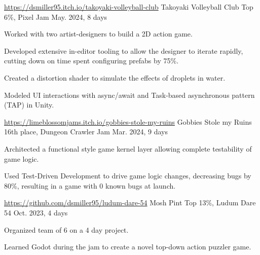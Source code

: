 \begin{cventries}
  \cventry
    {\href{https://dsmiller95.itch.io/takoyaki-volleyball-club}{https://dsmiller95.itch.io/takoyaki-volleyball-club}} %
    {Takoyaki Volleyball Club} %
    {Top 6\%, Pixel Jam} %
    {May. 2024, 8 days} %
    {
      \begin{cvitems} %
        \item {Worked with two artist-designers to build a 2D action game.}
        \item {Developed extensive in-editor tooling to allow the designer to iterate rapidly, cutting down on time spent configuring prefabs by 75\%.}
        \item {Created a distortion shader to simulate the effects of droplets in water.}
        \item {Modeled UI interactions with async/await and Task-based asynchronous pattern (TAP) in Unity.}
      \end{cvitems}
    }

  \cventry
   {\href{https://limeblossomjams.itch.io/gobbies-stole-my-ruins}{https://limeblossomjams.itch.io/gobbies-stole-my-ruins}} %
    {Gobbies Stole my Ruins} %
    {16th place, Dungeon Crawler Jam} %
    {Mar. 2024, 9 days} %
    {
      \begin{cvitems} %
        \item {Architected a functional style game kernel layer allowing complete testability of game logic.}
        \item {Used Test-Driven Development to drive game logic changes, decreasing bugs by 80\%, resulting in a game with 0 known bugs at launch.}
      \end{cvitems}
    }

  \cventry
   {\href{https://github.com/dsmiller95/ludum-dare-54}{https://github.com/dsmiller95/ludum-dare-54}} %
    {Mosh Pint} %
    {Top 13\%, Ludum Dare 54} %
    {Oct. 2023, 4 days} %
    {
      \begin{cvitems} %
        \item {Organized team of 6 on a 4 day project.}
        \item {Learned Godot during the jam to create a novel top-down action puzzler game.}
      \end{cvitems}
    }


\end{cventries}
